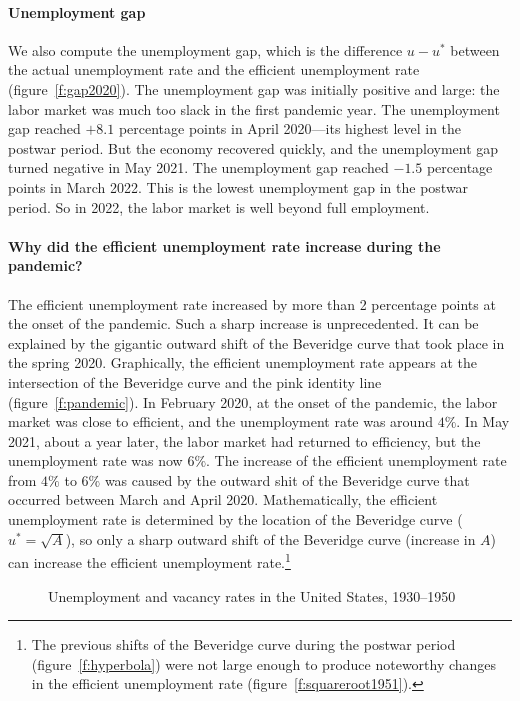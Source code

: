 \documentclass[letterpaper,12pt,leqno]{article}
\newcommand{\pdf}{../../figures/xsquareroot_202206.pdf}
\begin{document}
\paragraph{Unemployment gap} We also compute the unemployment gap, which is the difference $u-u^*$ between the actual unemployment rate and the efficient unemployment rate (figure~\ref{f:gap2020}). The unemployment gap was initially positive and large: the labor market was much too slack in the first pandemic year. The unemployment gap reached $+8.1$ percentage points in April 2020---its highest level in the postwar period. But the economy recovered quickly, and the unemployment gap turned negative in May 2021. The unemployment gap reached $-1.5$ percentage points in March 2022. This is the lowest unemployment gap in the postwar period. So in 2022, the labor market is well beyond full employment.

\paragraph{Why did the efficient unemployment rate increase during the pandemic?} The efficient unemployment rate increased by more than 2 percentage points at the onset of the pandemic. Such a sharp increase is unprecedented. It can be explained by the gigantic outward shift of the Beveridge curve that took place in the spring 2020. Graphically, the efficient unemployment rate appears at the intersection of the Beveridge curve and the pink identity line (figure~\ref{f:pandemic}). In February 2020, at the onset of the pandemic, the labor market was close to efficient, and the unemployment rate was around $4\%$. In May 2021, about a year later, the labor market had returned to efficiency, but the unemployment rate was now $6\%$. The increase of the efficient unemployment rate from $4\%$ to $6\%$ was caused by the outward shit of the Beveridge curve that occurred between March and April 2020. Mathematically, the efficient unemployment rate is determined by the location of the Beveridge curve ($u^* = \sqrt{A}$), so only a sharp outward shift of the Beveridge curve (increase in $A$) can increase the efficient unemployment rate.\footnote{The previous shifts of the Beveridge curve during the postwar period (figure~\ref{f:hyperbola}) were not large enough to produce noteworthy changes in the efficient unemployment rate (figure~\ref{f:squareroot1951}).}

\begin{figure}[t]
\hfill
{}
\caption{Unemployment and vacancy rates in the United States, 1930--1950}
\label{f:1930}\end{figure}
\end{document}
